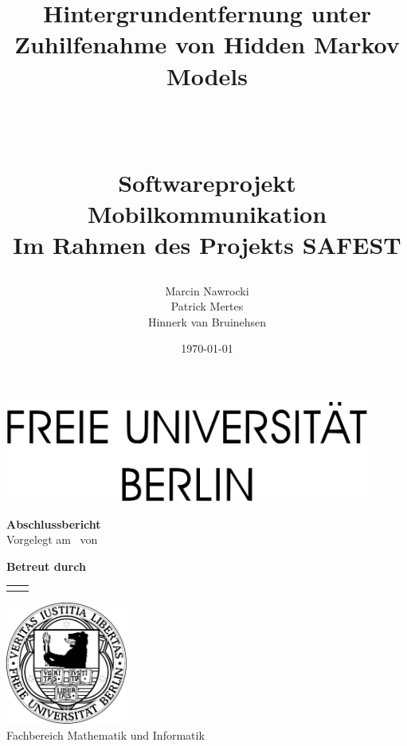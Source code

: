 \documentclass[10pt]{report}
\title{
	\begin{huge}Hintergrundentfernung unter Zuhilfenahme von Hidden Markov Models\end{huge}\\
		\vspace{1cm}
\begin{large}Softwareprojekt Mobilkommunikation\\Im Rahmen des Projekts SAFEST\end{large}}
\author{Marcin Nawrocki\\Patrick Mertes\\Hinnerk van Bruinehsen}
\date{\today}
\makeatletter
\newcommand{\advisor}{Prof.\@ Dr.\@ Katinka Wolter}
\newcommand{\coadvisor}{Dipl.-Inform.\@ Alexandra Danilkina}
\newcommand{\thesistype}{Abschlussbericht}
\makeatother
\begin{document}
\onehalfspacing



\begin{titlepage}
  \sffamily
  \large
  \begin{center}
    \includegraphics[width=12cm]{fu-inf-upper}
    \vfill
    \begin{huge}
      \makeatletter\@title\makeatother
    \end{huge}
    \vspace{2cm}
    \textbf{\thesistype}\\
    Vorgelegt am \makeatletter\@date\makeatother\ von\\[2ex]
    {\bf\makeatletter\@author\makeatother}
    \vfill

        \bf {Betreut durch} \\
      \begin{tabular}{r|l}
        \llap{\advisor} & \rlap{\coadvisor}
      \end{tabular}
    \vfill

    \includegraphics[width=4cm]{fu-inf-logo}\\[5mm]
    \textsf{\huge Fachbereich Mathematik und Informatik}
  \end{center}
  \restoregeometry
\end{titlepage}


\tableofcontents









\nocite{lamarre2002tracking}

\printbibliography
\end{document}
